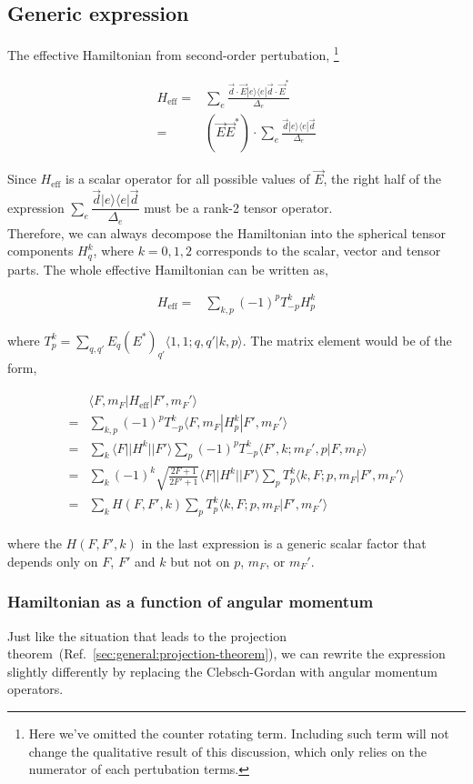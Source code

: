 \documentclass[10pt,fleqn]{article}
\newcommand{\dsum}{\displaystyle\sum}
\newcommand{\eqar}[1]
{
  \begin{align}
    #1
  \end{align}
}
\newcommand{\paren}[1]{{\left({#1}\right)}}
\begin{document}
\subsection{Generic expression}
The effective Hamiltonian from second-order pertubation,
\footnote{Here we've omitted the counter rotating term.
  Including such term will not change the qualitative result of this discussion,
  which only relies on the numerator of each pertubation terms.}
\eqar{
  H_{\mathrm{eff}}=&\sum_{e}\frac{\vec d\cdot\vec E|e\rangle\langle e|\vec d\cdot\vec E^*}{\Delta_e}\\
  =&\paren{\vec E\vec E^*}\cdot\sum_{e}\frac{\vec d|e\rangle\langle e|\vec d}{\Delta_e}
}
Since $H_{\mathrm{eff}}$ is a scalar operator for all possible values of $\vec E$,
the right half of the expression $\sum_{e}\dfrac{\vec d|e\rangle\langle e|\vec d}{\Delta_e}$ must be a rank-2 tensor operator.\\

Therefore, we can always decompose the Hamiltonian into the spherical tensor components
$H^k_q$, where $k=0,1,2$ corresponds to the scalar, vector and tensor parts.
The whole effective Hamiltonian can be written as,
\eqar{
  H_{\mathrm{eff}}=&\sum_{k,p}(-1)^p T^k_{-p}H^k_p
}
where $T^k_p=\dsum_{q,q'}E_q(E^*)_{q'}\langle 1,1;q,q'|k,p\rangle$.
The matrix element would be of the form,
\eqar{
  \begin{split}
    &\langle F,m_F|H_{\mathrm{eff}}|F',m_F'\rangle\\
    =&\sum_{k,p}(-1)^p T^k_{-p}\langle F,m_F|H^k_p|F',m_F'\rangle\\
    =&\sum_{k}\langle F||H^k||F'\rangle\sum_{p}(-1)^p T^k_{-p}
       \langle F',k;m_F',p|F,m_F\rangle\\
    =&\sum_{k}(-1)^{k}\sqrt{\frac{2F+1}{2F'+1}}\langle F||H^k||F'\rangle
       \sum_{p}T^k_{p}\langle k,F;p,m_F|F',m_F'\rangle\\
    =&\sum_{k}H(F,F',k)\sum_{p}T^k_{p}\langle k,F;p,m_F|F',m_F'\rangle
  \end{split}
}
where the $H(F,F',k)$ in the last expression is a generic scalar factor
that depends only on $F$, $F'$ and $k$ but not on $p$, $m_F$, or $m_F'$.

\subsubsection{Hamiltonian as a function of angular momentum}

Just like the situation that leads to the projection theorem~(Ref.~\ref{sec:general:projection-theorem}), we can rewrite the expression slightly differently by replacing
the Clebsch-Gordan with angular momentum operators.\\
\end{document}
